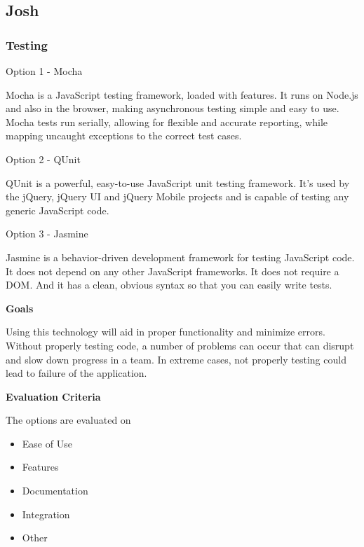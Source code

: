 \documentclass[letterpaper, 10pt, draftclsnofoot, compsoc, onecolumn]{IEEEtran}
\begin{document}
{%
\newpage
\subsection{Josh}
\vspace{1pc}

\subsubsection{Testing}
{\noindent Option 1 - Mocha \par}
{\noindent Mocha is a JavaScript testing framework, loaded with features. It runs on Node.js and also in the browser, making asynchronous testing simple and easy to use. Mocha tests run serially, allowing for flexible and accurate reporting, while mapping uncaught exceptions to the correct test cases. \cite{Mocha} \par}

\medskip
{\noindent Option 2 - QUnit \par}
{\noindent QUnit is a powerful, easy-to-use JavaScript unit testing framework. It's used by the jQuery, jQuery UI and jQuery Mobile projects and is capable of testing any generic JavaScript code. \cite{QUnit}  \par}

\medskip
{\noindent Option 3 - Jasmine \par}
{\noindent Jasmine is a behavior-driven development framework for testing JavaScript code. It does not depend on any other JavaScript frameworks. It does not require a DOM. And it has a clean, obvious syntax so that you can easily write tests. \cite{Jasmine}  \par}

\medskip
{\noindent\rmfamily\bfseries\color{black} Goals \par}
{\noindent Using this technology will aid in proper functionality and minimize errors. Without properly testing code, a number of problems can occur that can disrupt and slow down progress in a team. In extreme cases, not properly testing could lead to failure of the application. \par}

\medskip
\newpage
{\noindent\rmfamily\bfseries\color{black} Evaluation Criteria \par}
{\noindent The options are evaluated on 

\begin{itemize}
\item Ease of Use
\item Features
\item Documentation
\item Integration
\item Other
\end{itemize}

}}
\end{document}
